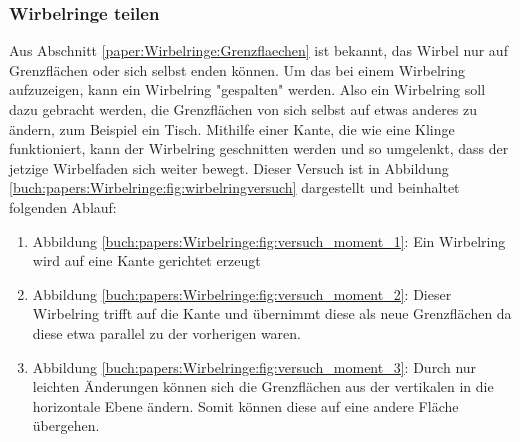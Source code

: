 \subsubsection{Wirbelringe teilen}

Aus Abschnitt \ref{paper:Wirbelringe:Grenzflaechen} ist bekannt, das Wirbel nur auf Grenzflächen oder sich selbst enden können. 
Um das bei einem Wirbelring aufzuzeigen, kann ein Wirbelring "gespalten" werden. 
Also ein Wirbelring soll dazu gebracht werden, die Grenzflächen von sich selbst auf etwas anderes zu ändern, zum Beispiel ein Tisch. 
Mithilfe einer Kante, die wie eine Klinge funktioniert, kann der Wirbelring geschnitten werden und so umgelenkt, dass der jetzige Wirbelfaden sich weiter bewegt. 
Dieser Versuch ist in Abbildung \ref{buch:papers:Wirbelringe:fig:wirbelringversuch} dargestellt und beinhaltet folgenden Ablauf:



\begin{enumerate}
    \item Abbildung \ref{buch:papers:Wirbelringe:fig:versuch_moment_1}: Ein Wirbelring wird auf eine Kante gerichtet erzeugt
    \item Abbildung \ref{buch:papers:Wirbelringe:fig:versuch_moment_2}: Dieser Wirbelring trifft auf die Kante und übernimmt diese als neue Grenzflächen da diese etwa parallel zu der vorherigen waren.
    \item Abbildung \ref{buch:papers:Wirbelringe:fig:versuch_moment_3}: Durch nur leichten Änderungen können sich die Grenzflächen aus der vertikalen in die horizontale Ebene ändern.
    Somit können diese auf eine andere Fläche übergehen.
\end{enumerate}
    
